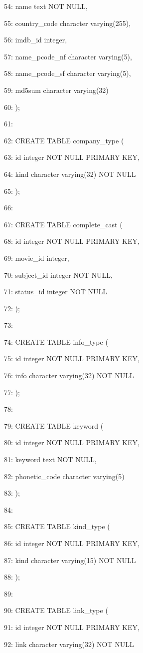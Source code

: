 \documentclass[11pt,a4paper]{article}
\begin{document}
54:     name text NOT NULL,

55:     country\_code character varying(255),

56:     imdb\_id integer,

57:     name\_pcode\_nf character varying(5),

58:     name\_pcode\_sf character varying(5),

59:     md5sum character varying(32)

60: );

61:

62: CREATE TABLE company\_type (

63:     id integer NOT NULL PRIMARY KEY,

64:     kind character varying(32) NOT NULL

65: );

66:

67: CREATE TABLE complete\_cast (

68:     id integer NOT NULL PRIMARY KEY,

69:     movie\_id integer,

70:     subject\_id integer NOT NULL,

71:     status\_id integer NOT NULL

72: );

73:

74: CREATE TABLE info\_type (

75:     id integer NOT NULL PRIMARY KEY,

76:     info character varying(32) NOT NULL

77: );

78:

79: CREATE TABLE keyword (

80:     id integer NOT NULL PRIMARY KEY,

81:     keyword text NOT NULL,

82:     phonetic\_code character varying(5)

83: );

84:

85: CREATE TABLE kind\_type (

86:     id integer NOT NULL PRIMARY KEY,

87:     kind character varying(15) NOT NULL

88: );

89:

90: CREATE TABLE link\_type (

91:     id integer NOT NULL PRIMARY KEY,

92:     link character varying(32) NOT NULL
\end{document}
